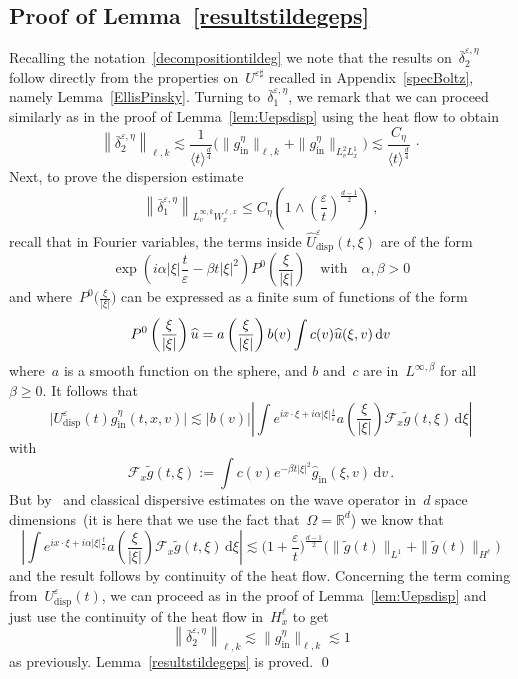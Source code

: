 \documentclass[11pt]{article}
\theoremstyle{definition}
\numberwithin{equation}{section}
\numberwithin{figure}{section}
\numberwithin{table}{section}
\newcommand*{\dd}{\mathrm{d}}
\newcommand*{\dv}{\dd v}
\newcommand*{\dxi}{\dd \xi}
\newcommand*\R {\mathbb{R}}
\newcommand*\eps{{\varepsilon}}
\newcommand*\e{{\varepsilon}}
\DeclareMathOperator{\inn}{in}
\DeclareMathOperator{\disp}{disp}
\let\oldhat\hat
\renewcommand*{\hat}[1]{\mathchoice{\widehat{#1}}{\widehat{#1}}{\oldhat{#1}}{\oldhat{#1}}}
\begin{document}
\subsection{Proof of Lemma~\ref{resultstildegeps}}\label{proofstrichartz}

Recalling the notation~\eqref{decompositiontildeg} we note that the results on~$ \bar \delta^{\eps,\eta}_2$ follow directly from the properties on~$U^{\eps \sharp}$ recalled in Appendix~\ref{specBoltz}, namely Lemma~\ref{EllisPinsky}. Turning to~$ \bar \delta^{\e,\eta}_1$, we remark that we can proceed similarly as in the proof of Lemma~\ref{lem:Uepsdisp} using the heat flow to obtain
\begin{equation}\label{eq:deltabar2}
\left\|\bar \delta^{\eps,\eta}_2\right\|_{\ell,k} \lesssim \frac{1}{\langle t \rangle^{\frac d4}} \big(\|g_{\inn}^\eta\|_{\ell,k} + \|g_{\inn}^\eta\|_{L^2_vL^1_x} \big) \lesssim \frac{C_\eta}{\langle t \rangle^\frac d4} \, \cdotp
\end{equation}
Next, to prove the dispersion estimate
\[
\left\|\bar \delta^{\eps,\eta}_1\right\|_{L^{\infty,k}_v W^{\ell,x}_x} \le C_\eta \left(1 \wedge \left(\frac{\eps}{t}\right)^{\frac{d-1}{2}} \right) \,,
\]
recall that in Fourier variables, the terms inside $\widehat U^\eps_{\disp}(t,\xi)$ are of the form
\[
\exp \left(i\alpha |\xi| \frac t\e - \beta t |\xi|^2 \right)P^0\left(\frac\xi{|\xi|}\right) \quad \text{with} \quad \alpha, \beta >0
\]
and where~$P^0\big(\frac\xi{|\xi|}\big)$ can be expressed as a finite sum of functions of the form
\[
P^0\left(\frac\xi{|\xi|}\right)\hat u = a\left(\frac\xi{|\xi|}\right)b(v)\int c(v)\hat u (\xi,v)\,\dv
\]
where~$a$ is a smooth function on the sphere, and $b$ and~$c$ are in~$L^{\infty,\beta}$ for all~$\beta \geq 0$. It follows that
\[
\big |U^\eps_{\disp}(t) g^\eta_{{\inn}} (t,x,v)\big| \lesssim |b(v)| \left| \int e^{ix\cdot \xi + {i\alpha |\xi| \frac t\e}} a\left(\frac\xi{|\xi|}\right) {\mathcal F}_x \widetilde g (t,\xi)\, \dxi \right|
\]
with
\[
{\mathcal F}_x \widetilde g (t,\xi):= \int c(v)e^{- \beta t |\xi|^2}\widehat g_{\inn} (\xi,v)\,\dv \,.
\]
But by~\cite{Ukai} and classical dispersive estimates on the wave operator in~$d$ space dimensions~(it is here that we use the fact that~$\Omega = \R^d$) we know that
\[
\left| \int e^{ix\cdot \xi + {i\alpha |\xi| \frac t\e}} a\left(\frac\xi{|\xi|}\right) {\mathcal F}_x\widetilde g(t,\xi)\, \dxi
\right|
\lesssim \Big(1+\frac\e t\Big)^{\frac{d-1}2} \big(\| \widetilde g(t)\|_{L^1} + \| \widetilde g(t)\|_{H^\ell}\big)
\]
and the result follows by continuity of the heat flow. Concerning the term coming from~$U^\eps_{\disp}(t)$, we can proceed as in the proof of Lemma~\ref{lem:Uepsdisp} and just use the continuity of the heat flow in~$H^\ell_x$ to get
\[
\left\|\bar \delta^{\eps,\eta}_2\right\|_{\ell,k} \lesssim \|g_{\inn}^\eta\|_{\ell,k} \lesssim 1
\]
as previously. Lemma~\ref{resultstildegeps} is proved.
\qed
\end{document}
